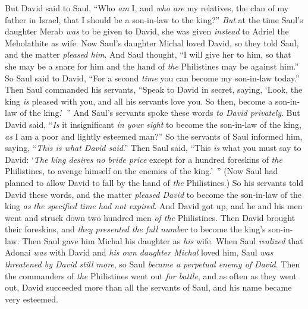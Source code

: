 \begin{biblechapter}
\verse But David said to Saul, “Who \textit{am} I, and \textit{who are} my relatives, the clan of my father in Israel, that I should be a son-in-law to the king?”
\verse \textit{But} at the time Saul’s daughter Merab \textit{was} to be given to David, she was given \textit{instead} to Adriel the Meholathite as wife.
\verse Now Saul’s daughter Michal loved David, so they told Saul, and the matter \textit{pleased him}.
\verse And Saul thought, “I will give her to him, so that she may be a snare for him and the hand of \textit{the} Philistines may be against him.” So Saul said to David, “For a second \textit{time} you can become my son-in-law today.”
\verse Then Saul commanded his servants, “Speak to David in secret, saying, ‘Look, the king \textit{is} pleased with you, and all his servants love you. So then, become a son-in-law of the king.’ ”
\verse And Saul’s servants spoke these words \textit{to David privately}. But David said, “\textit{Is} it insignificant \textit{in your sight} to become the son-in-law of the king, \textit{as} I am a poor and lightly esteemed man?”
\verse So the servants of Saul informed him, saying, “\textit{This is what David said}.”
\verse Then Saul said, “This \textit{is} what you must say to David: ‘\textit{The king desires no bride price} except for a hundred foreskins of \textit{the} Philistines, to avenge himself on the enemies of the king.’ ” (Now Saul had planned to allow David to fall by the hand of \textit{the} Philistines.)
\verse So his servants told David these words, and the matter \textit{pleased David} to become the son-in-law of the king \textit{as} \textit{the specified time had not expired}.
\verse And David got up, and he and his men went and struck down two hundred men \textit{of the} Philistines. Then David brought their foreskins, and \textit{they presented the full number} to become the king’s son-in-law. Then Saul gave him Michal his daughter as \textit{his} wife.
\verse When Saul \textit{realized} that Adonai \textit{was} with David and \textit{his own daughter Michal} loved him,
\verse Saul \textit{was threatened by David still more}, so Saul \textit{became a perpetual enemy of David}.
\verse Then the commanders of \textit{the} Philistines went out \textit{for battle}, and as often as they went out, David succeeded more than all the servants of Saul, and his name became very esteemed.
\end{biblechapter}

